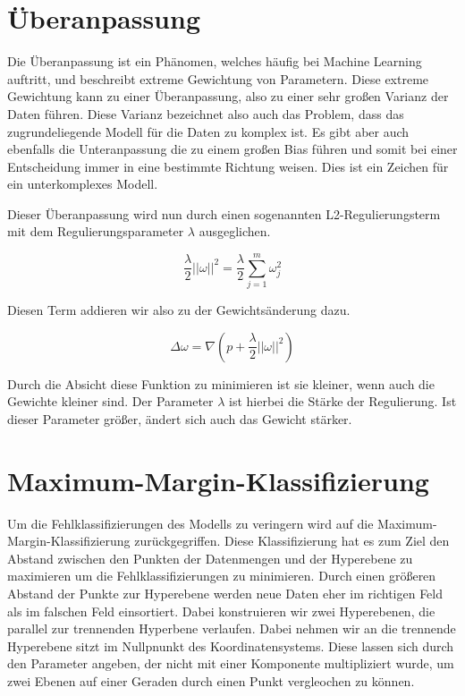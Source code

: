 \documentclass[11pt]{article} %
\begin{document}
\section{Überanpassung}

Die Überanpassung ist ein Phänomen, welches häufig bei Machine Learning auftritt, und beschreibt extreme Gewichtung von Parametern.
Diese extreme Gewichtung kann zu einer Überanpassung, also zu einer sehr großen Varianz der Daten führen. Diese Varianz bezeichnet also
auch das Problem, dass das zugrundeliegende Modell für die Daten zu komplex ist. Es gibt aber auch ebenfalls die Unteranpassung die
zu einem großen Bias führen und somit bei einer Entscheidung immer in eine bestimmte Richtung weisen. Dies ist ein Zeichen für ein unterkomplexes Modell.

Dieser Überanpassung wird nun durch einen sogenannten L2-Regulierungsterm mit dem Regulierungsparameter $\lambda$ ausgeglichen.

\begin{equation}
\frac{\lambda}{2} ||\omega ||^2 =\frac{\lambda}{2} \sum_{j=1}^m \omega_{j}^2
\end{equation}

Diesen Term addieren wir also zu der Gewichtsänderung dazu.

\begin{equation}
\Delta \omega = \nabla( p + \frac{\lambda}{2} ||\omega ||^2)
\end{equation}

Durch die Absicht diese Funktion zu minimieren ist sie kleiner, wenn auch die Gewichte kleiner sind. Der Parameter $\lambda$ ist hierbei
die Stärke der Regulierung. Ist dieser Parameter größer, ändert sich auch das Gewicht stärker.

\section{Maximum-Margin-Klassifizierung}
Um die Fehlklassifizierungen des Modells zu veringern wird auf die Maximum-Margin-Klassifizierung zurückgegriffen. Diese Klassifizierung 
hat es zum Ziel den Abstand zwischen den Punkten der Datenmengen und der Hyperebene zu maximieren um die Fehlklassifizierungen zu minimieren. Durch einen größeren Abstand der Punkte zur Hyperebene werden neue Daten eher im richtigen Feld als im falschen Feld 
einsortiert. Dabei konstruieren wir zwei Hyperebenen, die parallel zur trennenden Hyperbene verlaufen. Dabei nehmen wir an die  trennende Hyperebene sitzt im Nullpnunkt des Koordinatensystems. Diese lassen sich durch den Parameter angeben, der nicht mit einer Komponente multipliziert wurde, um zwei Ebenen auf einer Geraden durch einen Punkt vergleochen zu können.
\end{document}
